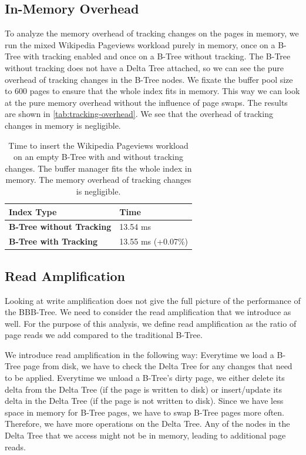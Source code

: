 
\subsection{In-Memory Overhead}
To analyze the memory overhead of tracking changes on the pages in memory, we run the mixed Wikipedia Pageviews workload purely in memory, once on a B-Tree with tracking enabled and once on a B-Tree without tracking.
The B-Tree without tracking does not have a Delta Tree attached, so we can see the pure overhead of tracking changes in the B-Tree nodes.
We fixate the buffer pool size to 600 pages to ensure that the whole index fits in memory.
This way we can look at the pure memory overhead without the influence of page swaps.
The results are shown in \autoref{tab:tracking-overhead}.
We see that the overhead of tracking changes in memory is negligible.

\begin{table}[ht]
\centering
\begin{tabular}{l|l}
\toprule
\textbf{Index Type} & Time \\
\midrule
\textbf{B-Tree without Tracking}  & 13.54 ms \\
\textbf{B-Tree with Tracking}  & 13.55 ms (+0.07\%) \\
\bottomrule
\end{tabular}
\caption{Time to insert the Wikipedia Pageviews workload on an empty B-Tree with and without tracking changes. The buffer manager fits the whole index in memory. The memory overhead of tracking changes is negligible.}
\label{tab:tracking-overhead}
\end{table}

\subsection{Read Amplification}
Looking at write amplification does not give the full picture of the performance of the BBB-Tree.
We need to consider the read amplification that we introduce as well.
For the purpose of this analysis, we define read amplification as the ratio of page reads we add compared to the traditional B-Tree.

We introduce read amplification in the following way:
Everytime we load a B-Tree page from disk, we have to check the Delta Tree for any changes that need to be applied.
Everytime we unload a B-Tree's dirty page, we either delete its delta from the Delta Tree (if the page is written to disk) or insert/update its delta in the Delta Tree (if the page is not written to disk).
Since we have less space in memory for B-Tree pages, we have to swap B-Tree pages more often.
Therefore, we have more operations on the Delta Tree.
Any of the nodes in the Delta Tree that we access might not be in memory, leading to additional page reads.

